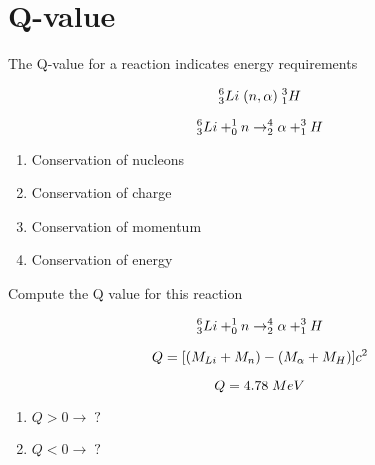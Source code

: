 \documentclass[aspectratio=1610,pdftex,dvipsnames,compress,xcolor={dvipsnames}]{beamer}
\begin{document}
\section{Q-value}


\addtocounter{framenumber}{-1}
\begin{frame}{The Q-value for a reaction indicates energy requirements}

    \begin{equation}
        \LARGE
        ^6_3Li \; (n,\alpha) \; ^3_1H
    \end{equation}

    \begin{equation}
        \LARGE
        ^6_3Li + ^1_0n \rightarrow ^4_2\alpha + ^3_1H
    \end{equation}

    \vspace*{\fill}

    \begin{enumerate}[series=outerlist,topsep=0pt,itemsep=15pt,leftmargin=*,label=(\arabic*)]
        \item Conservation of nucleons
        \item Conservation of charge
        \item Conservation of momentum
        \item Conservation of energy
    \end{enumerate}
\end{frame}


\begin{frame}{Compute the Q value for this reaction}

    \begin{equation}
        \LARGE
        ^6_3Li + ^1_0n \rightarrow ^4_2\alpha + ^3_1H
    \end{equation}

    \begin{equation}
        \LARGE
        Q = [(M_{Li} + M_n) - (M_{\alpha} + M_H)]c^2
    \end{equation}

    \begin{equation}
        \LARGE
        Q = 4.78 \; MeV
    \end{equation}

    \vspace*{\fill}

    \begin{enumerate}[series=outerlist,topsep=0pt,itemsep=21pt,leftmargin=*,label=(\arabic*)]
        \item[]\LARGE $Q > 0 \rightarrow \; ?$
        \item[]\LARGE $Q < 0 \rightarrow \; ?$
    \end{enumerate}
\end{frame}
\end{document}
